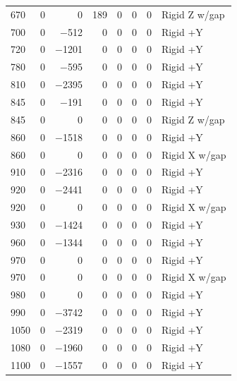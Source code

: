 \begin{longtable}{lrrrrrrl}
    670 & \num{0} & \num{0} & \num{189} & \num{0} & \num{0} & \num{0} & Rigid Z w/gap \\
    700 & \num{0} & \num{-512} & \num{0} & \num{0} & \num{0} & \num{0} & Rigid +Y \\
    720 & \num{0} & \num{-1201} & \num{0} & \num{0} & \num{0} & \num{0} & Rigid +Y \\
    780 & \num{0} & \num{-595} & \num{0} & \num{0} & \num{0} & \num{0} & Rigid +Y \\
    810 & \num{0} & \num{-2395} & \num{0} & \num{0} & \num{0} & \num{0} & Rigid +Y \\
    845 & \num{0} & \num{-191} & \num{0} & \num{0} & \num{0} & \num{0} & Rigid +Y \\
    845 & \num{0} & \num{0} & \num{0} & \num{0} & \num{0} & \num{0} & Rigid Z w/gap \\
    860 & \num{0} & \num{-1518} & \num{0} & \num{0} & \num{0} & \num{0} & Rigid +Y \\
    860 & \num{0} & \num{0} & \num{0} & \num{0} & \num{0} & \num{0} & Rigid X w/gap \\
    910 & \num{0} & \num{-2316} & \num{0} & \num{0} & \num{0} & \num{0} & Rigid +Y \\
    920 & \num{0} & \num{-2441} & \num{0} & \num{0} & \num{0} & \num{0} & Rigid +Y \\
    920 & \num{0} & \num{0} & \num{0} & \num{0} & \num{0} & \num{0} & Rigid X w/gap \\
    930 & \num{0} & \num{-1424} & \num{0} & \num{0} & \num{0} & \num{0} & Rigid +Y \\
    960 & \num{0} & \num{-1344} & \num{0} & \num{0} & \num{0} & \num{0} & Rigid +Y \\
    970 & \num{0} & \num{0} & \num{0} & \num{0} & \num{0} & \num{0} & Rigid +Y \\
    970 & \num{0} & \num{0} & \num{0} & \num{0} & \num{0} & \num{0} & Rigid X w/gap \\
    980 & \num{0} & \num{0} & \num{0} & \num{0} & \num{0} & \num{0} & Rigid +Y \\
    990 & \num{0} & \num{-3742} & \num{0} & \num{0} & \num{0} & \num{0} & Rigid +Y \\
    1050 & \num{0} & \num{-2319} & \num{0} & \num{0} & \num{0} & \num{0} & Rigid +Y \\
    1080 & \num{0} & \num{-1960} & \num{0} & \num{0} & \num{0} & \num{0} & Rigid +Y \\
    1100 & \num{0} & \num{-1557} & \num{0} & \num{0} & \num{0} & \num{0} & Rigid +Y \\

\end{longtable}
